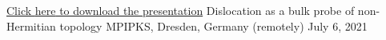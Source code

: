 

\begin{cventries}

  \cventry
    {\href{https://drive.google.com/file/d/18EtxINc68yc_Dt_sxsVkAIQNs8viJxYq/view?usp=sharing}{Click \underline{here} to download the presentation}} %
    {Dislocation as a bulk probe of non-Hermitian topology} %
    {MPIPKS, Dresden, Germany (remotely)} %
    {July 6, 2021} %
    {
      \begin{cvitems} %
      \end{cvitems}
    }

\end{cventries}

